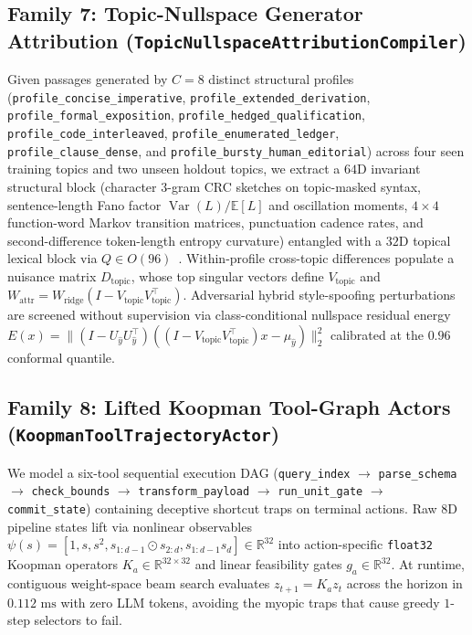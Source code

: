 \documentclass[11pt,a4paper]{article}
\begin{document}
\subsection{Family 7: Topic-Nullspace Generator Attribution (\texttt{TopicNullspaceAttributionCompiler})}
Given passages generated by $C = 8$ distinct structural profiles (\texttt{profile\_concise\_imperative}, \texttt{profile\_extended\_derivation}, \texttt{profile\_formal\_exposition}, \texttt{profile\_hedged\_qualification}, \texttt{profile\_code\_interleaved}, \texttt{profile\_enumerated\_ledger}, \texttt{profile\_clause\_dense}, and \texttt{profile\_bursty\_human\_editorial}) across four seen training topics and two unseen holdout topics, we extract a $64\text{D}$ invariant structural block (character $3$-gram CRC sketches on topic-masked syntax, sentence-length Fano factor $\operatorname{Var}(L)/\mathbb{E}[L]$ and oscillation moments, $4\times 4$ function-word Markov transition matrices, punctuation cadence rates, and second-difference token-length entropy curvature) entangled with a $32\text{D}$ topical lexical block via $Q \in O(96)$~\cite{stamatatos2009}. Within-profile cross-topic differences populate a nuisance matrix $D_{\text{topic}}$, whose top singular vectors define $V_{\text{topic}}$ and $W_{\text{attr}} = W_{\text{ridge}}(I - V_{\text{topic}} V_{\text{topic}}^\top)$. Adversarial hybrid style-spoofing perturbations are screened without supervision via class-conditional nullspace residual energy $E(x) = \|(I - U_{\hat{y}} U_{\hat{y}}^\top)((I - V_{\text{topic}} V_{\text{topic}}^\top)x - \mu_{\hat{y}})\|_2^2$ calibrated at the $0.96$ conformal quantile.

\subsection{Family 8: Lifted Koopman Tool-Graph Actors (\texttt{KoopmanToolTrajectoryActor})}
We model a six-tool sequential execution DAG (\texttt{query\_index} $\to$ \texttt{parse\_schema} $\to$ \texttt{check\_bounds} $\to$ \texttt{transform\_payload} $\to$ \texttt{run\_unit\_gate} $\to$ \texttt{commit\_state}) containing deceptive shortcut traps on terminal actions. Raw $8\text{D}$ pipeline states lift via nonlinear observables~\cite{koopman1931} $\psi(s) = [1, s, s^2, s_{1:d-1}\odot s_{2:d}, s_{1:d-1} s_d] \in \mathbb{R}^{32}$ into action-specific \texttt{float32} Koopman operators $K_a \in \mathbb{R}^{32 \times 32}$ and linear feasibility gates $g_a \in \mathbb{R}^{32}$. At runtime, contiguous weight-space beam search evaluates $z_{t+1} = K_a z_t$ across the horizon in $0.112\text{ ms}$ with zero LLM tokens, avoiding the myopic traps that cause greedy $1$-step selectors to fail.
\end{document}
